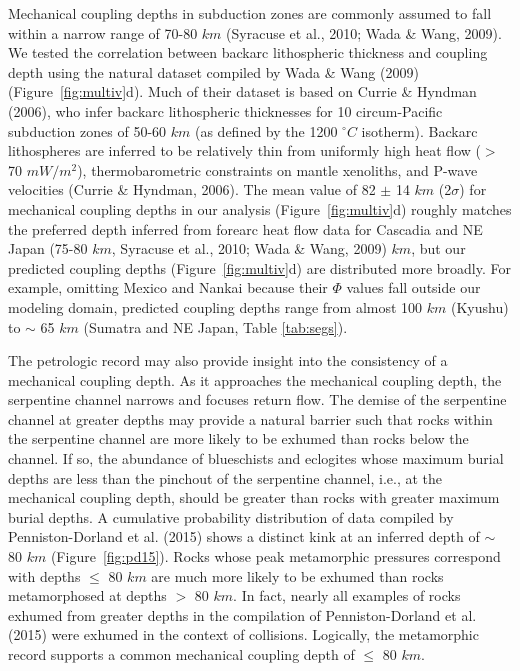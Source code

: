 \documentclass[draft,linenumbers]{agujournal2018}
\begin{document}
Mechanical coupling depths in subduction zones are commonly assumed to
fall within a narrow range of 70-80 \(km\) (Syracuse et al., 2010; Wada
\& Wang, 2009). We tested the correlation between backarc lithospheric
thickness and coupling depth using the natural dataset compiled by Wada
\& Wang (2009) (Figure~\ref{fig:multiv}d). Much of their dataset is
based on Currie \& Hyndman (2006), who infer backarc lithospheric
thicknesses for 10 circum-Pacific subduction zones of 50-60 \(km\) (as
defined by the 1200 \(^{\circ}C\) isotherm). Backarc lithospheres are
inferred to be relatively thin from uniformly high heat flow (\(>\) 70
\(mW/m^{2}\)), thermobarometric constraints on mantle xenoliths, and
P-wave velocities (Currie \& Hyndman, 2006). The mean value of 82
\(\pm\) 14 \(km\) (2\(\sigma\)) for mechanical coupling depths in our
analysis (Figure~\ref{fig:multiv}d) roughly matches the preferred depth
inferred from forearc heat flow data for Cascadia and NE Japan (75-80
\(km\), Syracuse et al., 2010; Wada \& Wang, 2009) \(km\), but our
predicted coupling depths (Figure~\ref{fig:multiv}d) are distributed
more broadly. For example, omitting Mexico and Nankai because their
\(\Phi\) values fall outside our modeling domain, predicted coupling
depths range from almost 100 \(km\) (Kyushu) to \(\sim\) 65 \(km\)
(Sumatra and NE Japan, Table \ref{tab:segs}).

The petrologic record may also provide insight into the consistency of a
mechanical coupling depth. As it approaches the mechanical coupling
depth, the serpentine channel narrows and focuses return flow. The
demise of the serpentine channel at greater depths may provide a natural
barrier such that rocks within the serpentine channel are more likely to
be exhumed than rocks below the channel. If so, the abundance of
blueschists and eclogites whose maximum burial depths are less than the
pinchout of the serpentine channel, i.e., at the mechanical coupling
depth, should be greater than rocks with greater maximum burial depths.
A cumulative probability distribution of data compiled by
Penniston-Dorland et al. (2015) shows a distinct kink at an inferred
depth of \(\sim\) 80 \(km\) (Figure~\ref{fig:pd15}). Rocks whose peak
metamorphic pressures correspond with depths \(\leq\) 80 \(km\) are much
more likely to be exhumed than rocks metamorphosed at depths \(>\) 80
\(km\). In fact, nearly all examples of rocks exhumed from greater
depths in the compilation of Penniston-Dorland et al. (2015) were
exhumed in the context of collisions. Logically, the metamorphic record
supports a common mechanical coupling depth of \(\leq\) 80 \(km\).
\end{document}
